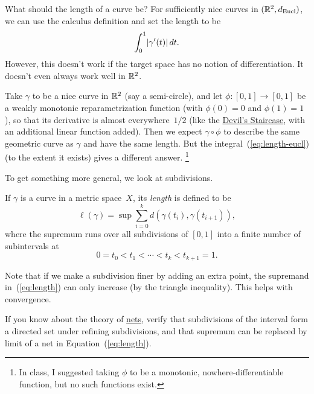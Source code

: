 \documentclass[12pt]{amsart}
\begin{document}
What should the length of a curve be? For sufficiently nice curves in
$(\mathbb R^2, d_{\text{Eucl}})$, we can use the calculus definition and set
the length to be
\begin{equation}
  \label{eq:length-eucl}
  \int_0^1 \lvert\gamma'(t)\rvert\,dt.
\end{equation}
However, this doesn't work if the target space has no notion of
differentiation. It doesn't even always work well in $\mathbb R^2$.

\begin{example}
  Take $\gamma$ to be a nice curve in $\mathbb R^2$ (say a semi-circle), and
  let $\phi \colon [0,1] \to [0,1]$ be a weakly monotonic
  reparametrization function (with $\phi(0) = 0$ and $\phi(1) = 1$),
  so that its derivative is almost everywhere~$1/2$ (like the
  \href{https://en.wikipedia.org/wiki/Cantor_function}{Devil's
    Staircase}, with an additional linear function added). Then we
  expect $\gamma \circ \phi$ to describe the same geometric curve as
  $\gamma$ and have the same length. But the
  integral~(\ref{eq:length-eucl}) (to the extent it exists) gives a
  different answer.%
  \footnote{In class, I suggested taking $\phi$ to be a monotonic,
    nowhere-differentiable function, but no such functions exist.}
\end{example}

To get something more general, we look at subdivisions.

\begin{definition}\label{def:length}
  If $\gamma$ is a curve in a metric space~$X$, its \emph{length} is
  defined to be
  \begin{equation}\label{eq:length}
    \ell(\gamma) = \sup \sum_{i=0}^k d(\gamma(t_i), \gamma(t_{i+1})),
  \end{equation}
  where the supremum runs over all subdivisions of $[0,1]$ into
  a finite number of subintervals at
  \[
    0 = t_0 < t_1 < \cdots < t_k < t_{k+1} = 1.
  \]
\end{definition}

Note that if we make a subdivision finer by adding an extra point, the
supremand in~(\ref{eq:length}) can only increase (by the triangle
inequality). This helps with convergence.

\begin{exercise}
  If you know about the theory of
  \href{https://en.wikipedia.org/wiki/Net_(mathematics)}{nets}, verify
  that subdivisions of the interval form a directed set under refining
  subdivisions, and that supremum can be replaced by limit of a net
  in Equation~(\ref{eq:length}).
\end{exercise}
\end{document}
